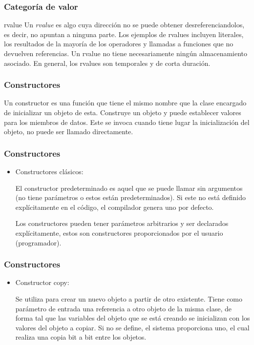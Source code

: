\documentclass{beamer}
\begin{document}
	\begin{frame}
		\frametitle{Categor\'ia de valor}
		\begin{block}{rvalue}
			Un \textit{rvalue} es algo cuya dirección no se puede obtener desreferenciandolos, es decir, no apuntan a ninguna parte. Los ejemplos de rvalues incluyen literales, los resultados de la mayoría de los operadores y llamadas a funciones que no devuelven referencias. Un rvalue no tiene necesariamente ningún almacenamiento asociado. En general, los rvalues son temporales y de corta duración.
		\end{block}
	\end{frame}

	\begin{frame}
		\frametitle{Constructores}
		Un constructor es una función que tiene el mismo nombre que la clase encargado de inicializar un objeto de esta. Construye un objeto y puede establecer valores para los miembros de datos. Este se invoca cuando tiene lugar la inicialización del objeto, no puede ser llamado directamente.
	\end{frame}

	\begin{frame}
		\frametitle{Constructores}
		\begin{itemize}
			\item Constructores cl\'asicos:
			
			El constructor predeterminado es aquel que se puede llamar sin argumentos (no tiene parámetros o estos est\'an predeterminados). Si este no está definido explícitamente en el código, el compilador genera uno por defecto.
			
			Los constructores pueden tener parámetros arbitrarios y ser declarados expl\'icitamente, estos son constructores proporcionados por el usuario (programador).	
		\end{itemize}
	\end{frame}
	
	\begin{frame}
		\frametitle{Constructores}
		\begin{itemize}
			\item Constructor copy:
			
			Se utiliza para crear un nuevo objeto a partir de otro existente. Tiene como parámetro de entrada una referencia a otro objeto de la misma clase, de forma tal que las variables del objeto que se está creando se inicializan con los valores del objeto a copiar. Si no se define, el sistema proporciona uno, el cual realiza una copia bit a bit entre los objetos.
		\end{itemize}
	\end{frame}
\end{document}
